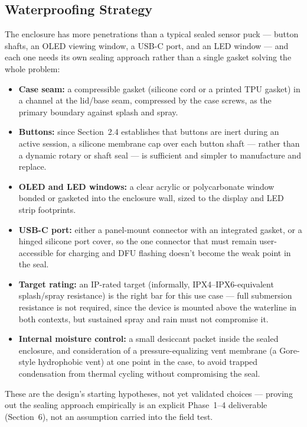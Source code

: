 \documentclass[11pt]{article}
\begin{document}
\subsection{Waterproofing Strategy}
The enclosure has more penetrations than a typical sealed sensor puck --- button shafts, an OLED viewing window, a USB-C port, and an LED window --- and each one needs its own sealing approach rather than a single gasket solving the whole problem:

\begin{itemize}[topsep=2pt,itemsep=2pt]
    \item \textbf{Case seam:} a compressible gasket (silicone cord or a printed TPU gasket) in a channel at the lid/base seam, compressed by the case screws, as the primary boundary against splash and spray.
    \item \textbf{Buttons:} since Section~2.4 establishes that buttons are inert during an active session, a silicone membrane cap over each button shaft --- rather than a dynamic rotary or shaft seal --- is sufficient and simpler to manufacture and replace.
    \item \textbf{OLED and LED windows:} a clear acrylic or polycarbonate window bonded or gasketed into the enclosure wall, sized to the display and LED strip footprints.
    \item \textbf{USB-C port:} either a panel-mount connector with an integrated gasket, or a hinged silicone port cover, so the one connector that must remain user-accessible for charging and DFU flashing doesn't become the weak point in the seal.
    \item \textbf{Target rating:} an IP-rated target (informally, IPX4--IPX6-equivalent splash/spray resistance) is the right bar for this use case --- full submersion resistance is not required, since the device is mounted above the waterline in both contexts, but sustained spray and rain must not compromise it.
    \item \textbf{Internal moisture control:} a small desiccant packet inside the sealed enclosure, and consideration of a pressure-equalizing vent membrane (a Gore-style hydrophobic vent) at one point in the case, to avoid trapped condensation from thermal cycling without compromising the seal.
\end{itemize}

These are the design's starting hypotheses, not yet validated choices --- proving out the sealing approach empirically is an explicit Phase~1--4 deliverable (Section~6), not an assumption carried into the field test.
\end{document}
